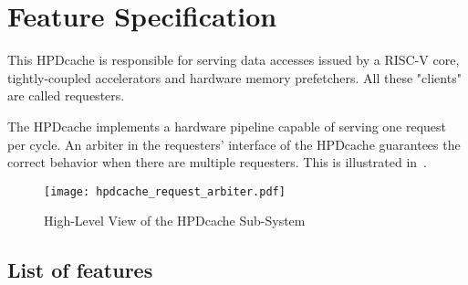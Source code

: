 \documentclass[10pt,titlepage,twoside]{book}
\begin{document}
\ifdefined\isdraft
\listoftodos
\newpage
\fi


%
%


\chapter{Feature Specification}%
\minitoc
\newpage

This \acf{HPDcache} is responsible for serving data accesses issued by a RISC-V core, tightly-coupled accelerators and hardware memory prefetchers.
All these "clients" are called requesters.

The \ac{HPDcache} implements a hardware pipeline capable of serving one request per cycle.
An arbiter in the requesters' interface of the \ac{HPDcache} guarantees the correct behavior when there are multiple requesters.
This is illustrated in~.

\begin{figure}[htbp]
  \texttt{[image: hpdcache\_request\_arbiter.pdf]}
  \caption{High-Level View of the HPDcache Sub-System}
\end{figure}

\newpage
\section{List of features}
\end{document}
